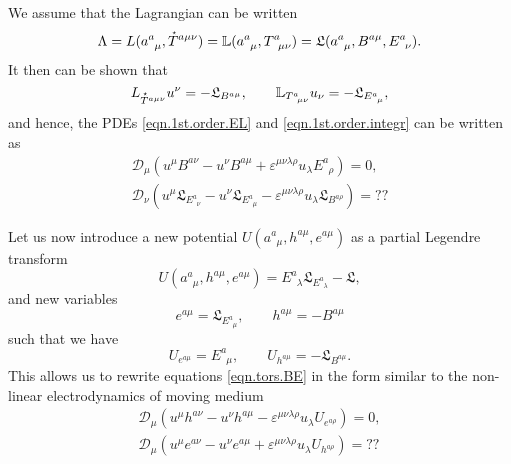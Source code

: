 \documentclass[
10pt, %
a4paper, %
oneside, %
headinclude,footinclude, %
BCOR5mm, %
]{scrartcl}
\newcommand{\tetr}[2]{a^{#1}_{\phantom{#1}#2}}
\newcommand{\D}[1]{\mathcal{D}_{#1}} %
\newcommand{\Tors}[2]{T^{#1}_{\phantom{a}#2}}
\newcommand{\ET}[2]{E^{#1}_{\phantom{#1}#2}}	%
\newcommand{\eT}[2]{e^{#1#2}}	%
\newcommand{\BT}[2]{B^{#1#2}}	%
\newcommand{\hT}[2]{h^{#1#2}}	%
\newcommand{\Laghodge}{L}%
\newcommand{\Lagtors}{\mathbb{L}}%
\newcommand{\LagBE}{\mathfrak{L}}%
\newcommand{\veps}{\varepsilon}
\newcommand{\HT}[1]{\accentset{\star}{T}^{#1}}
\begin{document}
We assume that the Lagrangian can be written 
\begin{equation}
\Lambda = \Laghodge(\tetr{a}{\mu},\HT{a\mu\nu}) = \Lagtors(\tetr{a}{\mu},\Tors{a}{\mu\nu}) = 
\LagBE(\tetr{a}{\mu},\BT{a}{\mu},\ET{a}{\nu}).
\end{equation}
It then can be shown that 
\begin{equation}
\Laghodge_{\HT{a\mu\nu}}u^\nu = -\LagBE_{\BT{a}{\mu}}, \qquad \Lagtors_{\Tors{a}{\mu\nu}}u_\nu = 
-\LagBE_{\ET{a}{\mu}},
\end{equation}
and hence, the PDEs \eqref{eqn.1st.order.EL} and \eqref{eqn.1st.order.integr} can be written as 
\begin{subequations}\label{eqn.tors.BE}
	\begin{align}
		\D{\mu}(u^\mu \BT{a}{\nu} - u^\nu\BT{a}{\mu} + 
		\veps^{\mu\nu\lambda\rho}u_\lambda\ET{a}{\rho}) = 0,\\[2mm]
		\D{\nu}(u^\mu \LagBE_{\ET{a}{\nu}} - u^\nu\LagBE_{\ET{a}{\mu}} - 
		\veps^{\mu\nu\lambda\rho}u_\lambda\LagBE_{\BT{a}{\rho}}) = ??
	\end{align}
\end{subequations}

Let us now introduce a new potential $ U(\tetr{a}{\mu},\hT{a}{\mu},\eT{a}{\mu}) $ as a partial 
Legendre transform
\begin{equation}
 U(\tetr{a}{\mu},\hT{a}{\mu},\eT{a}{\mu}) = \ET{a}{\lambda}\LagBE_{\ET{a}{\lambda}} - \LagBE,
\end{equation}
and new variables
\begin{equation}
\eT{a}{\mu} = \LagBE_{\ET{a}{\mu}}, \qquad \hT{a}{\mu} = -\BT{a}{\mu}
\end{equation}
such that we have
\begin{equation}
U_{\eT{a}{\mu}} = \ET{a}{\mu}, \qquad U_{\hT{a}{\mu}} = - \LagBE_{\BT{a}{\mu}}.
\end{equation}
This allows us to rewrite equations \eqref{eqn.tors.BE} in the form similar to the non-linear 
electrodynamics of moving medium~\cite{Obukhov2008,DPRZ2017}
\begin{subequations}
\begin{align}
\D{\mu}(u^\mu \hT{a}{\nu} - u^\nu\hT{a}{\mu} - \veps^{\mu\nu\lambda\rho}u_\lambda U_{\eT{a}{\rho}}) 
= 0,\\[2mm]
\D{\mu}(u^\mu\eT{a}{\nu} - u^\nu\eT{a}{\mu} + \veps^{\mu\nu\lambda\rho}u_\lambda U_{\hT{a}{\rho}})
= ??
\end{align}
\end{subequations}
\end{document}
